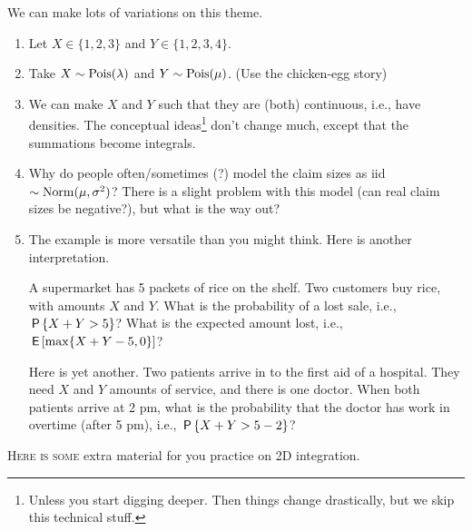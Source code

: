 \documentclass[lectures]{subfiles}
\begin{document}
\begin{remark}
We can  make lots of variations on this theme.
\begin{enumerate}
\item Let $X\in \{1,2,3\}$ and $Y\in \{1,2,3,4\}$.
\item Take $X\sim\Pois{\lambda}$ and $Y\sim\Pois{\mu}$. (Use the chicken-egg story)
\item We can make $X$ and $Y$ such that they are (both) continuous, i.e., have densities.
  The conceptual ideas\footnote{Unless you start digging deeper.
    Then things change drastically, but we skip this technical stuff.}
  don't change much, except that the summations become integrals.
\item Why do people often/sometimes (?)
  model the claim sizes as iid $\sim\Norm{\mu, \sigma^{2}}$?
  There is a slight problem with this model (can real claim sizes be negative?), but what is the way out?
\item The example is more versatile than you might think. Here is another interpretation.

A supermarket has 5 packets of rice on the shelf.
Two customers buy rice, with amounts $X$ and $Y$.
What is the probability of a lost sale, i.e., $\P{X+Y>5}$?
What is the expected amount lost, i.e., $\E{ \max\{X+Y - 5,0\}}$?

Here is yet another.
Two patients arrive in to the first aid of a hospital.
They need $X$ and $Y$ amounts of service, and there is one doctor.
When both patients arrive at 2 pm, what is the probability that the doctor has work in overtime (after 5 pm), i.e., $\P{X+Y > 5- 2}$?
\end{enumerate}
\end{remark}



\textsc{Here is some} extra material for you practice on 2D integration.
\end{document}
